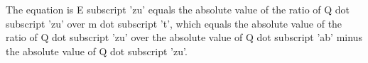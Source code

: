 The equation is E subscript 'zu' equals the absolute value of the ratio of Q dot subscript 'zu' over m dot subscript 't', which equals the absolute value of the ratio of Q dot subscript 'zu' over the absolute value of Q dot subscript 'ab' minus the absolute value of Q dot subscript 'zu'.